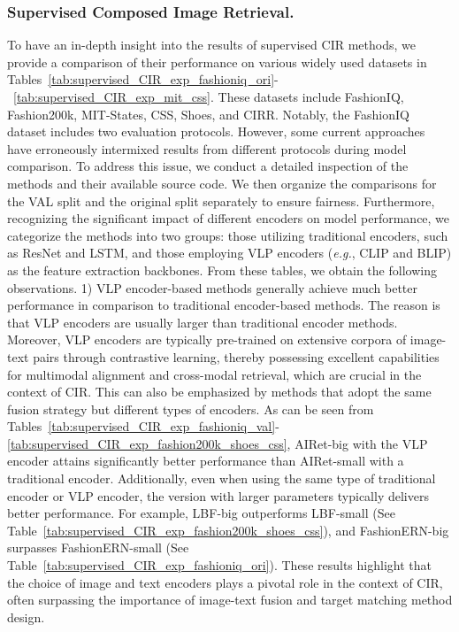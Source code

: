 \subsubsection{Supervised Composed Image Retrieval.} 
To have an in-depth insight into the results of supervised CIR methods, we provide a comparison of their performance on various widely used datasets in Tables~\ref{tab:supervised_CIR_exp_fashioniq_ori}-~\ref{tab:supervised_CIR_exp_mit_css}. These datasets include FashionIQ, Fashion200k, MIT-States, CSS, Shoes, and CIRR. 
Notably, the FashionIQ dataset includes two evaluation protocols. However, some current approaches have erroneously intermixed results from different protocols during model comparison. To address this issue, we conduct a detailed inspection of the methods and their available source code. We then organize the comparisons for the VAL split and the original split separately to ensure fairness.
Furthermore, recognizing the significant impact of different encoders on model performance, we categorize the methods into two groups: those utilizing traditional encoders, such as ResNet and LSTM, and those employing VLP encoders (\textit{e.g.}, CLIP and BLIP) as the feature extraction backbones. 
From these tables, we obtain the following observations. 
1) VLP encoder-based methods generally achieve much better performance in comparison to traditional encoder-based methods. The reason is that VLP encoders are usually larger than traditional encoder methods. Moreover, VLP encoders are typically pre-trained on extensive corpora of image-text pairs through contrastive learning, thereby possessing excellent capabilities for multimodal alignment and cross-modal retrieval, which are crucial in the context of CIR. This can also be emphasized by methods that adopt the same fusion strategy but different types of encoders. As can be seen from Tables~\ref{tab:supervised_CIR_exp_fashioniq_val}-\ref{tab:supervised_CIR_exp_fashion200k_shoes_css}, AIRet-big with the VLP encoder attains significantly better performance than AIRet-small with a traditional encoder. Additionally, even when using the same type of traditional encoder or VLP encoder, the version with larger parameters typically delivers better performance. For example, LBF-big outperforms LBF-small (See Table~\ref{tab:supervised_CIR_exp_fashion200k_shoes_css}), and FashionERN-big surpasses FashionERN-small (See Table~\ref{tab:supervised_CIR_exp_fashioniq_ori}).
These results highlight that the choice of image and text encoders plays a pivotal role in the context of CIR, often surpassing the importance of image-text fusion and target matching method design.
